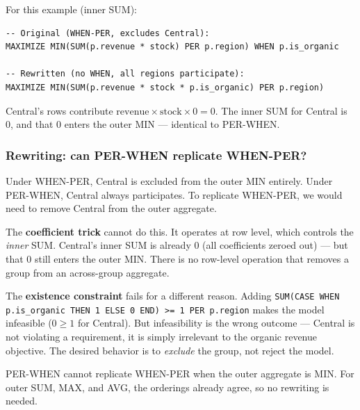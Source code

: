 \documentclass[11pt]{article}
\begin{document}
For this example (inner SUM):

\begin{lstlisting}
-- Original (WHEN-PER, excludes Central):
MAXIMIZE MIN(SUM(p.revenue * stock) PER p.region) WHEN p.is_organic

-- Rewritten (no WHEN, all regions participate):
MAXIMIZE MIN(SUM(p.revenue * stock * p.is_organic) PER p.region)
\end{lstlisting}

Central's rows contribute $\text{revenue} \times \text{stock} \times 0 = 0$.
The inner SUM for Central is 0, and that 0 enters the outer MIN ---
identical to PER-WHEN.

\subsubsection*{Rewriting: can PER-WHEN replicate WHEN-PER?}

Under WHEN-PER, Central is excluded from the outer MIN entirely. Under
PER-WHEN, Central always participates. To replicate WHEN-PER, we would
need to remove Central from the outer aggregate.

The \textbf{coefficient trick} cannot do this. It operates at row level,
which controls the \emph{inner} SUM. Central's inner SUM is already 0 (all
coefficients zeroed out) --- but that 0 still enters the outer MIN. There
is no row-level operation that removes a group from an across-group
aggregate.

The \textbf{existence constraint} fails for a different reason. Adding
\texttt{SUM(CASE WHEN p.is\_organic THEN 1 ELSE 0 END) >= 1 PER p.region}
makes the model infeasible ($0 \geq 1$ for Central). But infeasibility is
the wrong outcome --- Central is not violating a requirement, it is simply
irrelevant to the organic revenue objective. The desired behavior is to
\emph{exclude} the group, not reject the model.

PER-WHEN cannot replicate WHEN-PER when the outer aggregate is MIN.
For outer SUM, MAX, and AVG, the orderings already agree, so no rewriting
is needed.
\end{document}
